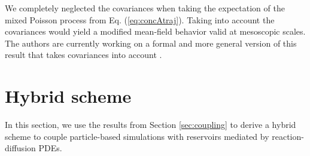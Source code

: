 \documentclass[10pt,twocolumn]{revtex4-1}
\begin{document}
	We completely neglected the covariances when taking the expectation of the mixed Poisson process from Eq. (\ref{eq:concAtraj}). Taking into account the covariances would yield a modified mean-field behavior valid at mesoscopic scales. The authors are currently working on a formal and more general version of this result that takes covariances into account \cite{kostreHydrolimit}.
	
	
	\section{Hybrid scheme}\label{sec:hybridscheme}
	In this section, we use the results from Section \ref{sec:coupling} to derive a hybrid scheme to couple particle-based simulations with reservoirs mediated by reaction-diffusion PDEs. 
	
\end{document}

